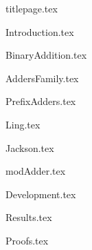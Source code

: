 \documentclass[a4paper,11pt]{article}
\numberwithin{equation}{section} %
\begin{document}
{titlepage.tex}


\tableofcontents
\clearpage

\listoffigures
\listoftables
\clearpage



{Introduction.tex}
\clearpage



{BinaryAddition.tex}
\clearpage



{AddersFamily.tex}
\clearpage



{PrefixAdders.tex}
\clearpage



{Ling.tex}
\clearpage



{Jackson.tex}
\clearpage



{modAdder.tex}
\clearpage




{Development.tex}
\clearpage



{Results.tex}
\clearpage




{Proofs.tex}
\clearpage






\end{document}
